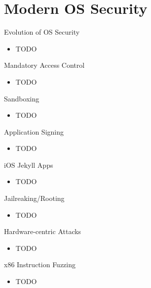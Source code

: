 \documentclass{curs}
\begin{document}
\section{Modern OS Security}

\begin{frame}{Evolution of OS Security}
  \begin{itemize}
    \item TODO
  \end{itemize}
\end{frame}

\begin{frame}{Mandatory Access Control}
  \begin{itemize}
    \item TODO
  \end{itemize}
\end{frame}

\begin{frame}{Sandboxing}
  \begin{itemize}
    \item TODO
  \end{itemize}
\end{frame}

\begin{frame}{Application Signing}
  \begin{itemize}
    \item TODO
  \end{itemize}
\end{frame}

\begin{frame}{iOS Jekyll Apps}
  \begin{itemize}
    \item TODO
  \end{itemize}
\end{frame}

\begin{frame}{Jailreaking/Rooting}
  \begin{itemize}
    \item TODO
  \end{itemize}
\end{frame}

\begin{frame}{Hardware-centric Attacks}
  \begin{itemize}
    \item TODO
  \end{itemize}
\end{frame}

\begin{frame}{x86 Instruction Fuzzing}
  \begin{itemize}
    \item TODO
  \end{itemize}
\end{frame}
\end{document}
